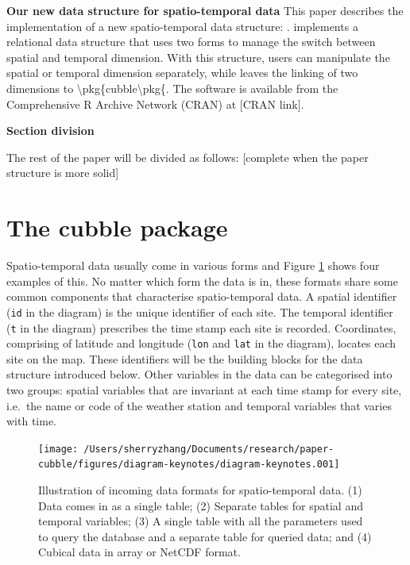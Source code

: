 \documentclass[
]{jss}
\begin{document}
\textbf{Our new data structure for spatio-temporal data} This paper
describes the implementation of a new spatio-temporal data structure:
.  implements a relational data structure that
uses two forms to manage the switch between spatial and temporal
dimension. With this structure, users can manipulate the spatial or
temporal dimension separately, while leaves the linking of two
dimensions to \textbackslash pkg\{cubble\textbackslash pkg\{. The
software is available from the Comprehensive R Archive Network (CRAN) at
{[}CRAN link{]}. \newline

\textbf{Section division}

The rest of the paper will be divided as follows: {[}complete when the
paper structure is more solid{]}

\newpage

\hypertarget{the-cubble-package}{%
\section{The cubble package}\label{the-cubble-package}}

Spatio-temporal data usually come in various forms and Figure
\ref{fig:cubble-diagram} shows four examples of this. No matter which
form the data is in, these formats share some common components that
characterise spatio-temporal data. A spatial identifier (\texttt{id} in
the diagram) is the unique identifier of each site. The temporal
identifier (\texttt{t} in the diagram) prescribes the time stamp each
site is recorded. Coordinates, comprising of latitude and longitude
(\texttt{lon} and \texttt{lat} in the diagram), locates each site on the
map. These identifiers will be the building blocks for the data
structure introduced below. Other variables in the data can be
categorised into two groups: spatial variables that are invariant at
each time stamp for every site, i.e.~the name or code of the weather
station and temporal variables that varies with time.

\begin{CodeChunk}
\begin{figure}

{\centering \texttt{[image: /Users/sherryzhang/Documents/research/paper-cubble/figures/diagram-keynotes/diagram-keynotes.001]} 

}

\caption[Illustration of incoming data formats for spatio-temporal data]{Illustration of incoming data formats for spatio-temporal data. (1) Data comes in as a single table; (2) Separate tables for spatial and temporal variables; (3) A single table with all the parameters used to query the database and a separate table for queried data; and (4) Cubical data in array or NetCDF format.}\label{fig:cubble-diagram}
\end{figure}
\end{CodeChunk}
\end{document}

